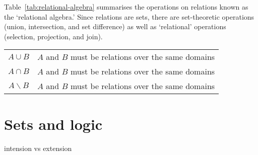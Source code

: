 \documentclass[10pt, a4paper, twocolumn]{article}
\begin{document}
Table~\ref{tab:relational-algebra} summarises the operations on relations known
as the `relational algebra.' Since relations are sets, there are set-theoretic
operations (union, intersection, and set difference) as well as `relational'
operations (selection, projection, and join).

\begin{table}[ht]
  \begin{tabular}{cl}
    $A \cup B$ & $A$ and $B$ must be relations over the same domains \\
    $A \cap B$ & $A$ and $B$ must be relations over the same domains \\
    $A \backslash B$ & $A$ and $B$ must be relations over the same domains \\
    

  \end{tabular}
\end{table}



\section{Sets and logic}




intension vs extension












\printbibliography
\end{document}
